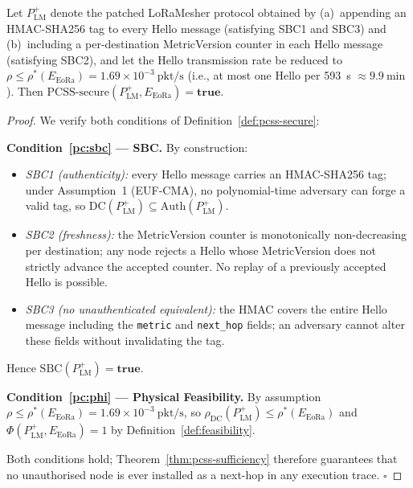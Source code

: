 \begin{corollary}
\label{cor:loramesher-patched-pcss}
Let $P_{\mathrm{LM}}^{+}$ denote the patched LoRaMesher protocol
obtained by (a)~appending an HMAC-SHA256 tag to every Hello message
(satisfying SBC1 and SBC3) and (b)~including a per-destination
MetricVersion counter in each Hello message (satisfying SBC2), and
let the Hello transmission rate be reduced to
$\rho \le \rho^*(E_{\mathrm{EoRa}}) = 1.69 \times 10^{-3}\ \mathrm{pkt/s}$
(i.e., at most one Hello per 593~s $\approx 9.9\ \mathrm{min}$).
Then $\mathrm{PCSS\text{-}secure}(P_{\mathrm{LM}}^{+}, E_{\mathrm{EoRa}}) = \mathbf{true}$.
\end{corollary}

\begin{proof}
We verify both conditions of Definition~\ref{def:pcss-secure}:

\medskip
\noindent\textbf{Condition~\ref{pc:sbc} — SBC.}\quad
By construction:
\begin{itemize}
  \item \emph{SBC1 (authenticity):} every Hello message carries an
        HMAC-SHA256 tag; under Assumption~1 (EUF-CMA), no polynomial-time
        adversary can forge a valid tag, so
        $\mathrm{DC}(P_{\mathrm{LM}}^{+}) \subseteq \mathrm{Auth}(P_{\mathrm{LM}}^{+})$.
  \item \emph{SBC2 (freshness):} the MetricVersion counter is
        monotonically non-decreasing per destination; any node rejects a
        Hello whose MetricVersion does not strictly advance the accepted
        counter.  No replay of a previously accepted Hello is possible.
  \item \emph{SBC3 (no unauthenticated equivalent):} the
        HMAC covers the entire Hello message including the
        \texttt{metric} and \texttt{next\_hop} fields; an adversary
        cannot alter these fields without invalidating the tag.
\end{itemize}
Hence $\mathrm{SBC}(P_{\mathrm{LM}}^{+}) = \mathbf{true}$.

\medskip
\noindent\textbf{Condition~\ref{pc:phi} — Physical Feasibility.}\quad
By assumption $\rho \le \rho^*(E_{\mathrm{EoRa}}) = 1.69 \times 10^{-3}\ \mathrm{pkt/s}$,
so $\rho_{\mathrm{DC}}(P_{\mathrm{LM}}^{+}) \le \rho^*(E_{\mathrm{EoRa}})$
and $\Phi(P_{\mathrm{LM}}^{+}, E_{\mathrm{EoRa}}) = 1$ by
Definition~\ref{def:feasibility}.

\medskip
Both conditions hold; Theorem~\ref{thm:pcss-sufficiency} therefore
guarantees that no unauthorised node is ever installed as a next-hop in
any execution trace.
\hfill$\square$
\end{proof}

